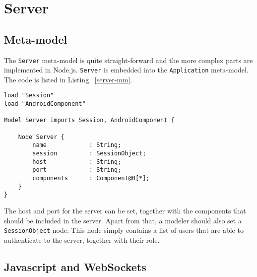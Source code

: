 \section{Server}

\subsection{Meta-model}

The \texttt{Server} meta-model is quite straight-forward and the more complex parts are implemented in Node.js. \texttt{Server} is embedded into the \texttt{Application} meta-model. The code is listed in Listing ~\ref{server-mm}.

\begin{lstlisting}[label=server-mm,caption=Server meta-model, captionpos=t]
load "Session"
load "AndroidComponent"

Model Server imports Session, AndroidComponent {

	Node Server {
		name 			: String;
		session 		: SessionObject;
		host 			: String;
		port 			: String;
		components 		: Component@0[*];
	}
}
\end{lstlisting}
The host and port for the server can be set, together with the components that should be included in the server. Apart from that, a modeler should also set a \texttt{SessionObject} node. This node simply contains a list of users that are able to authenticate to the server, together with their role. 

\subsection{Javascript and WebSockets}

